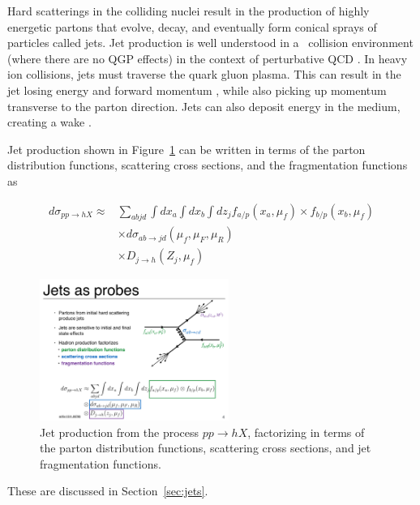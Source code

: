 

Hard scatterings in the colliding nuclei result in the production of highly energetic partons that evolve, decay, and eventually form conical sprays of particles called jets. Jet production is well understood in a \pp\ collision environment (where there are no QGP effects) in the context of perturbative QCD \cite{161}. In heavy ion collisions, jets must traverse the quark gluon plasma. This can result in the jet losing energy and forward momentum \cite{162, 163}, while also picking up momentum transverse to the parton direction. Jets can also deposit energy in the medium, creating a wake \cite{71, 70}. 

Jet production shown in Figure~\ref{fig:feynman_jet} can be written in terms of the parton distribution functions, scattering cross sections, and the fragmentation functions as

\begin{align}
d \sigma_{pp \rightarrow hX} \approx & \sum_{abjd} \int dx_a \int dx_b \int dz_j f_{a/p} (x_a, \mu_f) \times f_{b/p} (x_b, \mu_f) \\
& \times d\sigma_{ab\rightarrow jd} (\mu_f, \mu_F, \mu_R) \\
& \times D_{j \rightarrow h} (Z_j, \mu_f)
\end{align}

\begin{figure}[htbp]
\begin{center}
\includegraphics[width=0.55\textwidth]{figures/theory/feynman_jet}
\caption{Jet production from the process $pp \rightarrow hX$, factorizing in terms of the parton distribution functions, scattering cross sections, and jet fragmentation functions. \cite{arXiv:1511.00790}}
\label{fig:feynman_jet}
\end{center}
\end{figure}


 These are discussed in Section~\ref{sec:jets}. 


